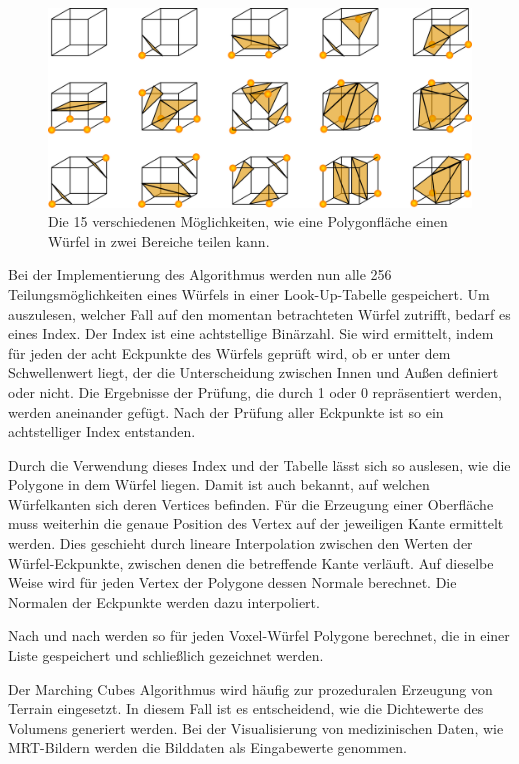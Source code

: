 \begin{figure}[!htb]
	\centering
	\includegraphics[width=0.7\linewidth]{images/MarchingCubes.png}
	\caption{Die 15 verschiedenen Möglichkeiten, wie eine Polygonfläche einen Würfel in zwei Bereiche teilen kann.}
	\label{img:marchingCubes}
\end{figure}
\FloatBarrier

Bei der Implementierung des Algorithmus werden nun alle 256 Teilungsmöglichkeiten eines Würfels in einer Look-Up-Tabelle gespeichert. Um auszulesen, welcher Fall auf den momentan betrachteten Würfel zutrifft, bedarf es eines Index. 
Der Index ist eine achtstellige Binärzahl. Sie wird ermittelt, indem für jeden der acht Eckpunkte des Würfels geprüft wird, ob er unter dem Schwellenwert liegt, der die Unterscheidung zwischen Innen und Außen definiert oder nicht. Die Ergebnisse der Prüfung, die durch 1 oder 0 repräsentiert werden, werden aneinander gefügt. Nach der Prüfung aller Eckpunkte ist so ein achtstelliger Index entstanden. 

Durch die Verwendung dieses Index und der Tabelle lässt sich so auslesen, wie die Polygone in dem Würfel liegen. Damit ist auch bekannt, auf welchen Würfelkanten sich deren Vertices befinden. Für die Erzeugung einer Oberfläche muss weiterhin die genaue Position des Vertex auf der jeweiligen Kante ermittelt werden. Dies geschieht durch lineare Interpolation zwischen den Werten der Würfel-Eckpunkte, zwischen denen die betreffende Kante verläuft. 
Auf dieselbe Weise wird für jeden Vertex der Polygone dessen Normale berechnet. Die Normalen der Eckpunkte werden dazu interpoliert.

Nach und nach werden so für jeden Voxel-Würfel Polygone berechnet, die in einer Liste gespeichert und schließlich gezeichnet werden.

Der Marching Cubes Algorithmus wird häufig zur prozeduralen Erzeugung von Terrain eingesetzt. In diesem Fall ist es entscheidend, wie die Dichtewerte des Volumens generiert werden. Bei der Visualisierung von medizinischen Daten, wie MRT-Bildern werden die Bilddaten als Eingabewerte genommen.


